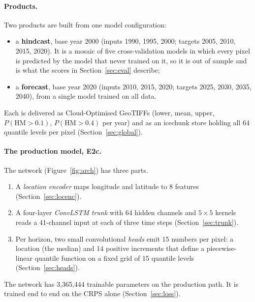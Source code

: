 \documentclass[11pt,a4paper]{article}
\newcommand{\HM}{\mathrm{HM}}
\begin{document}
\paragraph{Products.} Two products are built from one model configuration:
\begin{itemize}
\item a \textbf{hindcast}, base year 2000 (inputs 1990, 1995, 2000; targets 2005, 2010, 2015,
  2020). It is a mosaic of five cross-validation models in which every pixel is predicted by the
  model that never trained on it, so it is out of sample and is what the scores in
  Section~\ref{sec:eval} describe;
\item a \textbf{forecast}, base year 2020 (inputs 2010, 2015, 2020; targets 2025, 2030, 2035,
  2040), from a single model trained on all data.
\end{itemize}
Each is delivered as Cloud-Optimised GeoTIFFs (lower, mean, upper, $P(\HM>0.1)$,
$P(\HM>0.4)$ per year) and as an icechunk store holding all 64 quantile levels per pixel
(Section~\ref{sec:global}).

\paragraph{The production model, E2c.} The network (Figure~\ref{fig:arch}) has three parts.
\begin{enumerate}
\item A \emph{location encoder} maps longitude and latitude to 8 features
  (Section~\ref{sec:locenc}).
\item A four-layer \emph{ConvLSTM trunk} with 64 hidden channels and $5\times5$ kernels reads a
  41-channel input at each of three time steps (Section~\ref{sec:trunk}).
\item Per horizon, two small convolutional \emph{heads} emit 15 numbers per pixel: a location
  (the median) and 14 positive increments that define a piecewise-linear quantile function on a
  fixed grid of 15 quantile levels (Section~\ref{sec:heads}).
\end{enumerate}
The network has 3,365,444 trainable parameters on the production path. It is trained end to end
on the CRPS alone (Section~\ref{sec:loss}).
\end{document}
